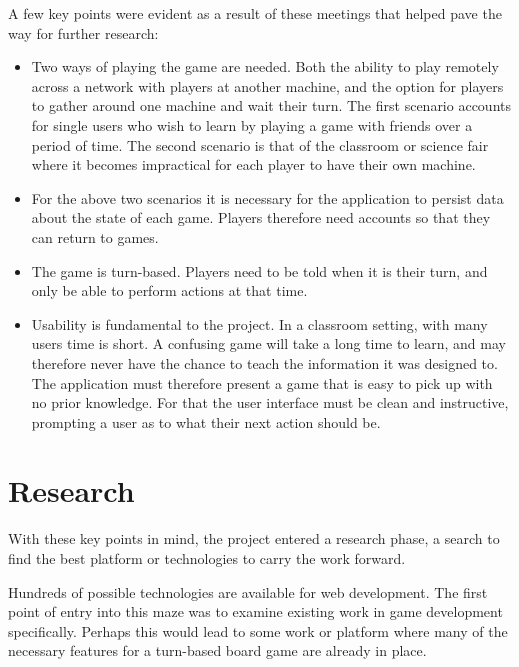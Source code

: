 A few key points were evident as a result of these meetings that helped pave the way for further research:
\begin{itemize}
	\item Two ways of playing the game are needed. Both the ability to play remotely across a network with players at another machine, and the option for players to gather around one machine and wait their turn. The first scenario accounts for single users who wish to learn by playing a game with friends over a period of time. The second scenario is that of the classroom or science fair where it becomes impractical for each player to have their own machine.
	\item For the above two scenarios it is necessary for the application to persist data about the state of each game. Players therefore need accounts so that they can return to games. 
	\item The game is turn-based. Players need to be told when it is their turn, and only be able to perform actions at that time.
	\item Usability is fundamental to the project. In a classroom setting, with many users time is short. A confusing game will take a long time to learn, and may therefore never have the chance to teach the information it was designed to. The application must therefore present a game that is easy to pick up with no prior knowledge. For that the user interface must be clean and instructive, prompting a user as to what their next action should be.
\end{itemize}

\section{Research}
With these key points in mind, the project entered a research phase, a search to find the best platform or technologies to carry the work forward.
	
Hundreds of possible technologies are available for web development. The first point of entry into this maze was to examine existing work in game development specifically. Perhaps this would lead to some work or platform where many of the necessary features for a turn-based board game are already in place.

